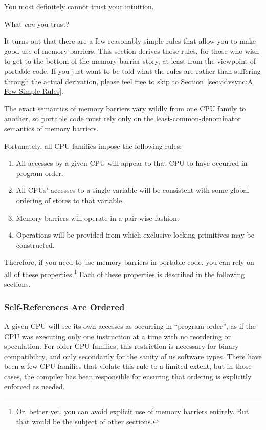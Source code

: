 You most definitely cannot trust your intuition.

What \emph{can} you trust?

It turns out that there are a few reasonably simple rules that
allow you to make good use of memory barriers.
This section derives those rules, for those who wish to get
to the bottom of the memory-barrier story, at least from the viewpoint
of portable code.
If you just want to be told what the rules are rather than suffering
through the actual derivation,
please feel free to skip to Section~\ref{sec:advsync:A Few Simple Rules}.

The exact semantics of memory barriers vary wildly from one CPU family to
another, so portable code must rely only on the least-common-denominator
semantics of memory barriers.

Fortunately, all CPU families impose the following rules:
\begin{enumerate}
\item	All accesses by a given CPU will appear to that CPU to have
	occurred in program order.
\item	All CPUs' accesses to a single variable will be consistent with
	some global ordering of stores to that variable.
\item	Memory barriers will operate in a pair-wise fashion.
\item	Operations will be provided from which exclusive locking
	primitives may be constructed.
\end{enumerate}

Therefore, if you need to use memory barriers in portable code,
you can rely on all of these properties.\footnote{
	Or, better yet, you can avoid explicit use of memory barriers
	entirely.
	But that would be the subject of other sections.}
Each of these properties is described in the following sections.

\subsubsection{Self-References Are Ordered}

A given CPU will see its own accesses as occurring in ``program order'',
as if the CPU was executing only one instruction at a time with no
reordering or speculation.
For older CPU families, this restriction is necessary for binary compatibility,
and only secondarily for the sanity of us software types.
There have been a few CPU families that violate this rule to a limited extent,
but in those cases, the compiler has been responsible
for ensuring that ordering is explicitly enforced as needed.

